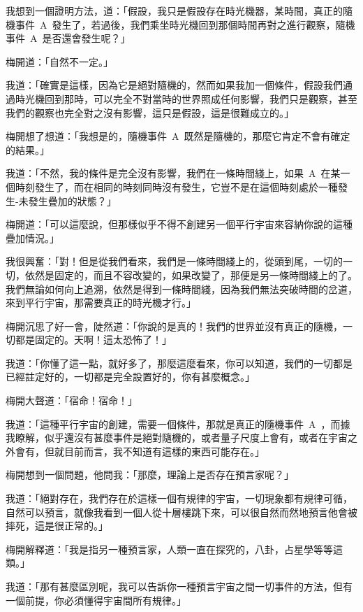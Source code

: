 我想到一個證明方法，道：「假設，我只是假設存在時光機器，某時間，真正的隨機事件~A~發生了，若過後，我們乘坐時光機回到那個時間再對之進行觀察，隨機事件~A~是否還會發生呢？」

梅開道：「自然不一定。」

我道：「確實是這樣，因為它是絕對隨機的，然而如果我加一個條件，假設我們通過時光機回到那時，可以完全不對當時的世界照成任何影響，我們只是觀察，甚至我們的觀察也完全對之沒有影響，這只是假設，這是很難成立的。」

梅開想了想道：「我想是的，隨機事件~A~既然是隨機的，那麼它肯定不會有確定的結果。」

我道：「不然，我的條件是完全沒有影響，我們在一條時間綫上，如果~A~在某一個時刻發生了，而在相同的時刻同時沒有發生，它豈不是在這個時刻處於一種發生-未發生疊加的狀態？」

梅開道：「可以這麼說，但那樣似乎不得不創建另一個平行宇宙來容納你說的這種疊加情況。」

我很興奮：「對！但是從我們看來，我們是一條時間綫上的，從頭到尾，一切的一切，依然是固定的，而且不容改變的，如果改變了，那便是另一條時間綫上的了。我們無論如何向上追溯，依然是得到一條時間綫，因為我們無法突破時間的岔道，來到平行宇宙，那需要真正的時光機才行。」

梅開沉思了好一會，陡然道：「你說的是真的！我們的世界並沒有真正的隨機，一切都是固定的。天啊！這太恐怖了！」

我道：「你懂了這一點，就好多了，那麼這麼看來，你可以知道，我們的一切都是已經註定好的，一切都是完全設置好的，你有甚麼概念。」

梅開大聲道：「宿命！宿命！」

我道：「這種平行宇宙的創建，需要一個條件，那就是真正的隨機事件~A~，而據我瞭解，似乎還沒有甚麼事件是絕對隨機的，或者量子尺度上會有，或者在宇宙之外會有，但就目前而言，我不知道有這樣的東西可能存在。」

梅開想到一個問題，他問我：「那麼，理論上是否存在預言家呢？」

我道：「絕對存在，我們存在於這樣一個有規律的宇宙，一切現象都有規律可循，自然可以預言，就像我看到一個人從十層樓跳下來，可以很自然而然地預言他會被摔死，這是很正常的。」

梅開解釋道：「我是指另一種預言家，人類一直在探究的，八卦，占星學等等這類。」

我道：「那有甚麼區別呢，我可以告訴你一種預言宇宙之間一切事件的方法，但有一個前提，你必須懂得宇宙間所有規律。」

